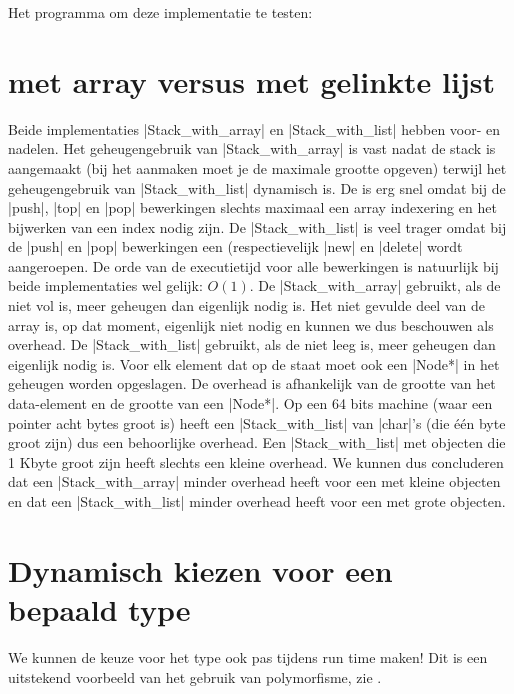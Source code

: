 \begin{cpplstShortInline}
Het programma  om deze implementatie te testen:


\section{ met array versus  met gelinkte lijst}
Beide implementaties |Stack_with_array| en |Stack_with_list| hebben voor- en nadelen.
Het geheugengebruik van |Stack_with_array| is vast nadat de stack is aangemaakt (bij het aanmaken moet je de maximale grootte opgeven) terwijl het geheugengebruik van |Stack_with_list| dynamisch is.
De  is erg snel omdat bij de |push|, |top| en |pop| bewerkingen slechts maximaal een array indexering en het bijwerken van een index nodig zijn.
De |Stack_with_list| is veel trager omdat bij de |push| en |pop| bewerkingen een  (respectievelijk |new| en |delete| wordt aangeroepen.
De orde van de executietijd voor alle bewerkingen is natuurlijk bij beide implementaties wel gelijk: $O(1)$.
De |Stack_with_array| gebruikt, als de  niet vol is, meer geheugen dan eigenlijk nodig is.
Het niet gevulde deel van de array is, op dat moment, eigenlijk niet nodig en kunnen we dus beschouwen als overhead.
De |Stack_with_list| gebruikt, als de  niet leeg is, meer geheugen dan eigenlijk nodig is.
Voor elk element dat op de  staat moet ook een |Node*| in het geheugen worden opgeslagen.
De overhead is afhankelijk van de grootte van het data\hyp{}element en de grootte van een |Node*|.
Op een 64 bits machine (waar een pointer acht bytes groot is) heeft een |Stack_with_list| van |char|'s (die één byte groot zijn) dus een behoorlijke overhead.
Een |Stack_with_list| met objecten die 1 Kbyte groot zijn heeft slechts een kleine overhead.
We kunnen dus concluderen dat een |Stack_with_array| minder overhead heeft voor een  met kleine objecten en dat een |Stack_with_list| minder overhead heeft voor een  met grote objecten.

\section{Dynamisch kiezen voor een bepaald type }
\label{sec:dynamischeStack}
We kunnen de keuze voor het type  ook pas tijdens run time maken! 
Dit is een uitstekend voorbeeld van het gebruik van polymorfisme, zie .


\end{cpplstShortInline}
